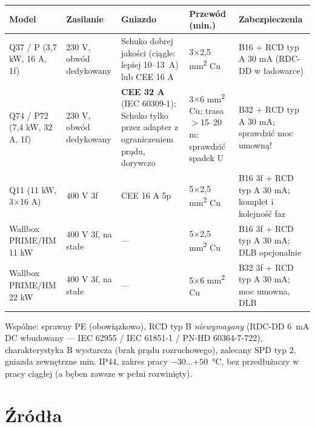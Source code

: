 \documentclass[11pt]{article}
\newcommand{\key}[1]{\textbf{\color{navy}#1}}
\begin{document}
{\small
\begin{tabularx}{\textwidth}{@{}p{3.1cm}p{2.5cm}p{2.9cm}p{2.6cm}Y@{}}
\toprule
\textbf{\sffamily Model} & \textbf{\sffamily Zasilanie} & \textbf{\sffamily Gniazdo} & \textbf{\sffamily Przewód (min.)} & \textbf{\sffamily Zabezpieczenia}\\
\midrule
Q37 / P (3,7 kW, 16 A, 1f) & 230 V, obwód dedykowany & Schuko dobrej jakości (ciągle: lepiej 10--13~A) lub CEE 16 A & 3$\times$2,5 mm\textsuperscript{2} Cu & B16 + RCD typ A 30 mA (RDC-DD w ładowarce)\\
\addlinespace[2pt]
Q74 / P72 (7,4 kW, 32 A, 1f) & 230 V, obwód dedykowany & \key{CEE 32 A} (IEC 60309-1); Schuko tylko przez adapter z ograniczeniem prądu, dorywczo & 3$\times$6 mm\textsuperscript{2} Cu; trasa $>$15--20 m: sprawdzić spadek U & B32 + RCD typ A 30 mA; sprawdzić moc umowną!\\
\addlinespace[2pt]
Q11 (11 kW, 3$\times$16 A) & 400 V 3f & CEE 16 A 5p & 5$\times$2,5 mm\textsuperscript{2} Cu & B16 3f + RCD typ A 30 mA; komplet i kolejność faz\\
\addlinespace[2pt]
Wallbox PRIME/HM 11 kW & 400 V 3f, na stałe & — & 5$\times$2,5 mm\textsuperscript{2} Cu & B16 3f + RCD typ A 30 mA; DLB opcjonalnie\\
\addlinespace[2pt]
Wallbox PRIME/HM 22 kW & 400 V 3f, na stałe & — & 5$\times$6 mm\textsuperscript{2} Cu & B32 3f + RCD typ A 30 mA; moc umowna, DLB\\
\bottomrule
\end{tabularx}
}

Wspólne: sprawny PE (obowiązkowo), RCD typ B \emph{niewymagany} (RDC-DD 6~mA DC wbudowany — IEC 62955 / IEC 61851-1 / PN-HD 60364-7-722), charakterystyka B wystarcza (brak prądu rozruchowego), zalecany SPD typ 2, gniazda zewnętrzne min. IP44, zakres pracy $-30$...$+50$~°C, bez przedłużaczy w pracy ciągłej (a bęben zawsze w pełni rozwinięty).

\section{Źródła}\label{sec:zrodla}
\end{document}
